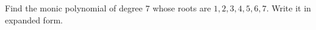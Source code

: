Find the monic polynomial of degree $7$ whose roots are $1,2,3,4,5,6,7$. Write it in expanded form.
